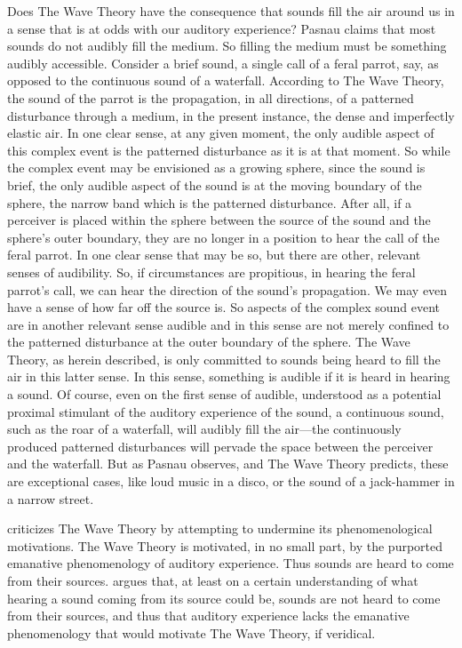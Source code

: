 Does The Wave Theory have the consequence that sounds fill the air around us in a sense that is at odds with our auditory experience? Pasnau claims that most sounds do not audibly fill the medium. So filling the medium must be something audibly accessible. Consider a brief sound, a single call of a feral parrot, say, as opposed to the continuous sound of a waterfall. According to The Wave Theory, the sound of the parrot is the propagation, in all directions, of a patterned disturbance through a medium, in the present instance, the dense and imperfectly elastic air. In one clear sense, at any given moment, the only audible aspect of this complex event is the patterned disturbance as it is at that moment. So while the complex event may be envisioned as a growing sphere, since the sound is brief, the only audible aspect of the sound is at the moving boundary of the sphere, the narrow band which is the patterned disturbance. After all, if a perceiver is placed within the sphere between the source of the sound and the sphere's outer boundary, they are no longer in a position to hear the call of the feral parrot. In one clear sense that may be so, but there are other, relevant senses of audibility. So, if circumstances are propitious, in hearing the feral parrot's call, we can hear the direction of the sound's propagation. We may even have a sense of how far off the source is. So aspects of the complex sound event are in another relevant sense audible and in this sense are not merely confined to the patterned disturbance at the outer boundary of the sphere. The Wave Theory, as herein described, is only committed to sounds being heard to fill the air in this latter sense. In this sense, something is audible if it is heard in hearing a sound. Of course, even on the first sense of audible, understood as a potential proximal stimulant of the auditory experience of the sound, a continuous sound, such as the roar of a waterfall, will audibly fill the air---the continuously produced patterned disturbances will pervade the space between the perceiver and the waterfall. But as Pasnau observes, and The Wave Theory predicts, these are exceptional cases, like loud music in a disco, or the sound of a jack-hammer in a narrow street.

\citet[chapter 3.4]{OCallaghan:2007xy} criticizes The Wave Theory by attempting to undermine its phenomenological motivations. The Wave Theory is motivated, in no small part, by the purported emanative phenomenology of auditory experience. Thus sounds are heard to come from their sources. \citet{OCallaghan:2007xy,OCallaghan:2009aa} argues that, at least on a certain understanding of what hearing a sound coming from its source could be, sounds are not heard to come from their sources, and thus that auditory experience lacks the emanative phenomenology that would motivate The Wave Theory, if veridical.

